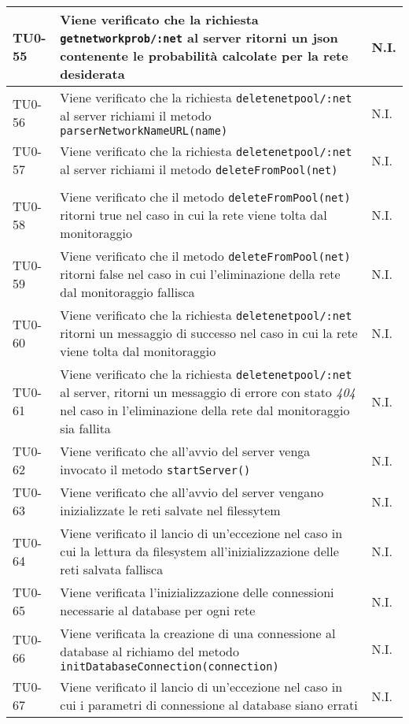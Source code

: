 \begin{longtable}{|C{.15\textwidth}|m{.65\textwidth}|C{.20\textwidth}|}
\hline 
TU0-55 & Viene verificato che la richiesta \texttt{getnetworkprob/:net} al server ritorni un json contenente le probabilità calcolate per la rete desiderata & N.I. \\ 
\hline 
{} TU0-56 & Viene verificato che la richiesta \texttt{deletenetpool/:net} al server richiami il metodo \texttt{parserNetworkNameURL(name)} & N.I. \\ 
\hline
TU0-57 & Viene verificato che la richiesta \texttt{deletenetpool/:net} al server richiami il metodo \texttt{deleteFromPool(net)} & N.I. \\ \\
\hline 
{} TU0-58 & Viene verificato che il metodo \texttt{deleteFromPool(net)} ritorni true nel caso in cui la rete viene tolta dal monitoraggio & N.I. \\ 
\hline
TU0-59 & Viene verificato che il metodo \texttt{deleteFromPool(net)} ritorni false nel caso in cui l'eliminazione della rete dal monitoraggio fallisca & N.I. \\ 
\hline 
{} TU0-60 & Viene verificato che la richiesta \texttt{deletenetpool/:net} ritorni un messaggio di successo nel caso in cui la rete viene tolta dal monitoraggio & N.I. \\ 
\hline 
TU0-61 & Viene verificato che la richiesta \texttt{deletenetpool/:net} al server, ritorni un messaggio di errore con stato \textit{404} nel caso in l'eliminazione della rete dal monitoraggio sia fallita & N.I. \\ 
\hline 
{} TU0-62 & Viene verificato che all'avvio del server venga invocato il metodo \texttt{startServer()} & N.I. \\ 
\hline
TU0-63 & Viene verificato che all'avvio del server vengano inizializzate le reti salvate nel filessytem & N.I. \\ 
\hline
{}TU0-64 & Viene verificato il lancio di un'eccezione nel caso in cui la lettura da filesystem all'inizializzazione delle reti salvata fallisca & N.I. \\ 
\hline
TU0-65 & Viene verificata l'inizializzazione delle connessioni necessarie al database per ogni rete & N.I. \\ 
\hline
{}TU0-66 &  Viene verificata la creazione di una connessione al database al richiamo del metodo \texttt{initDatabaseConnection(connection)} & N.I.\\ 
\hline
TU0-67 & Viene verificato il lancio di un'eccezione nel caso in cui i parametri di connessione al database siano errati & N.I. \\

\end{longtable}
